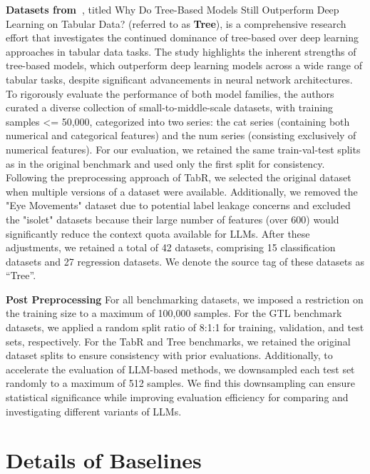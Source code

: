 \textbf{Datasets from~\citep{grinsztajn2022tree_gt_tab_nn}}, titled Why Do Tree-Based Models Still Outperform Deep Learning on Tabular Data? (referred to as \textbf{Tree}), is a comprehensive research effort that investigates the continued dominance of tree-based over deep learning approaches in tabular data tasks. The study highlights the inherent strengths of tree-based models, which outperform deep learning models across a wide range of tabular tasks, despite significant advancements in neural network architectures. To rigorously evaluate the performance of both model families, the authors curated a diverse collection of small-to-middle-scale datasets, with training samples <= 50,000, categorized into two series: the cat series (containing both numerical and categorical features) and the num series (consisting exclusively of numerical features). 
For our evaluation, we retained the same train-val-test splits as in the original benchmark and used only the first split for consistency. Following the preprocessing approach of TabR, we selected the original dataset when multiple versions of a dataset were available. Additionally, we removed the "Eye Movements" dataset due to potential label leakage concerns and excluded the "isolet" datasets because their large number of features (over 600) would significantly reduce the context quota available for LLMs. After these adjustments, we retained a total of 42 datasets, comprising 15 classification datasets and 27 regression datasets.
We denote the source tag of these datasets as ``Tree''.

\textbf{Post Preprocessing} For all benchmarking datasets, we imposed a restriction on the training size to a maximum of 100,000 samples. For the GTL benchmark datasets, we applied a random split ratio of 8:1:1 for training, validation, and test sets, respectively. For the TabR and Tree benchmarks, we retained the original dataset splits to ensure consistency with prior evaluations. Additionally, to accelerate the evaluation of LLM-based methods, we downsampled each test set randomly to a maximum of 512 samples.
We find this downsampling can ensure statistical significance while improving evaluation efficiency for comparing and investigating different variants of LLMs.

\section{Details of Baselines}

